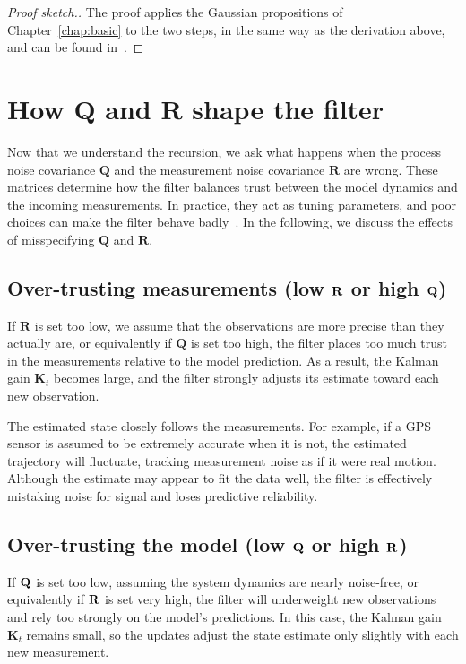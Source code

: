 \begin{proof}[Proof sketch.]
The proof applies the Gaussian propositions of Chapter~\ref{chap:basic} to the two steps, in the same way as the derivation above, and can be found in~\cite[p.~57 and 58]{sarkka:bayesian_filtering}.
\end{proof}

\section{How Q and R shape the filter}\label{sec:qr}
Now that we understand the recursion, we ask what happens when the process noise covariance $\mathbf{Q}$ and the measurement noise covariance $\mathbf{R}$ are wrong. These matrices determine how the filter balances trust between the model dynamics and the incoming measurements. In practice, they act as tuning parameters, and poor choices can make the filter behave badly~\cite[Ch.~7]{labbe:kalman_and_bayesian_filters}. In the following, we discuss the effects of misspecifying $\mathbf{Q}$ and $\mathbf{R}$.

\subsection*{Over-trusting measurements (low $\mathbf{R}$ or high $\mathbf{Q}$)} 
If $\mathbf{R}$ is set too low, we assume that the observations are more precise than they actually are, or equivalently if $\mathbf{Q}$ is set too high, the filter places too much trust in the measurements relative to the model prediction. As a result, the Kalman gain $\mathbf{K}_t$ becomes large, and the filter strongly adjusts its estimate toward each new observation.

The estimated state closely follows the measurements. For example, if a GPS sensor is assumed to be extremely accurate when it is not, the estimated trajectory will fluctuate, tracking measurement noise as if it were real motion. Although the estimate may appear to fit the data well, the filter is effectively mistaking noise for signal and loses predictive reliability.

\subsection*{Over-trusting the model (low $\mathbf{Q}$ or high $\mathbf{R}$)} 
If $\mathbf{Q}$ is set too low, assuming the system dynamics are nearly noise-free, or equivalently if $\mathbf{R}$ is set very high, the filter will underweight new observations and rely too strongly on the model's predictions. In this case, the Kalman gain $\mathbf{K}_t$ remains small, so the updates adjust the state estimate only slightly with each new measurement. 

